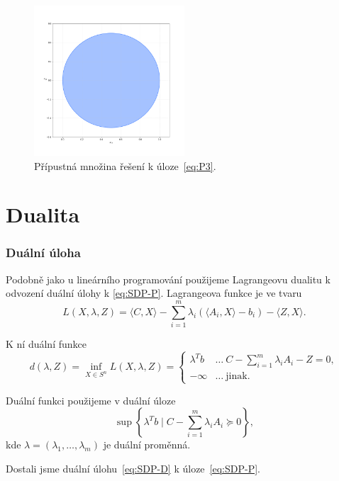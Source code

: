 \begin{figure}[h!]
    \centering
    \includegraphics[width=0.5\textwidth]{img/ex3.png}   
    \caption{Přípustná množina řešení k úloze~\ref{eq:P3}.}
    \label{fig:ex3}
\end{figure}

\section{Dualita}

\subsubsection*{Duální úloha}

Podobně jako u lineárního programování použijeme Lagrangeovu dualitu k odvození duální úlohy k \ref{eq:SDP-P}. Lagrangeova funkce je ve tvaru
$$
    L(X, \lambda, Z) = \langle C, X \rangle - \sum_{i=1}^m \lambda_i \left( \langle A_i, X \rangle - b_i \right) - \langle Z, X \rangle.
$$

\noindent K ní duální funkce
$$
    d(\lambda, Z) = \inf_{X \in S^n} L(X, \lambda, Z) = 
    \begin{cases}
        \lambda^T b & \dots\ C - \sum_{i=1}^m \lambda_i A_i - Z = 0, \\
        -\infty     & \dots\ \text{jinak.}
    \end{cases}
$$

\noindent Duální funkci použijeme v duální úloze
\begin{equation}\tag{SDP-D}
    \sup\left\{ \lambda^Tb \mid C - \sum_{i=1}^m \lambda_i A_i \succeq 0 \right\},
    \label{eq:SDP-D}
\end{equation}
kde $\lambda = (\lambda_1, \dots, \lambda_m)$ je duální proměnná.

\noindent Dostali jsme duální úlohu~\ref{eq:SDP-D} k úloze~\ref{eq:SDP-P}.

